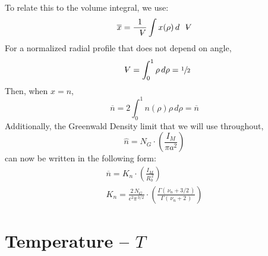 To relate this to the volume integral, we use:
\begin{equation}
	\overline{x} = \frac{1}{\volume} \int x(\rho) \, d\volume
\end{equation}
For a normalized radial profile that does not depend on angle,
\begin{equation}
	\volume = \int_0^1 \rho \, d\rho = \sfrac{1}{2}
\end{equation}
Then, when $x = n$,
\begin{equation}
	\overline{n} = 2 \int_0^1 n(\rho) \rho \, d\rho = \overline{n}
\end{equation}
Additionally, the Greenwald Density limit that we will use throughout,
\begin{equation}
	\hat{n} = N_G \cdot \left( \frac{I_M}{\pi a^2} \right) 
\end{equation} 
can now be written in the following form:
\begin{gather}
	\overline{n} =K_{n} \cdot \left( \frac{I_M}{R_0^{\,2}} \right) \\
	K_n = \frac{2 \, N_G}{\epsilon^2 \pi ^ { \, 3/2} }\cdot \left( \frac{ \Gamma( \, \nu_n + 3/2 \, ) }{ \Gamma( \, \nu_n + 2 \, ) } \right)
\end{gather}

\section{Temperature -- $T$}

